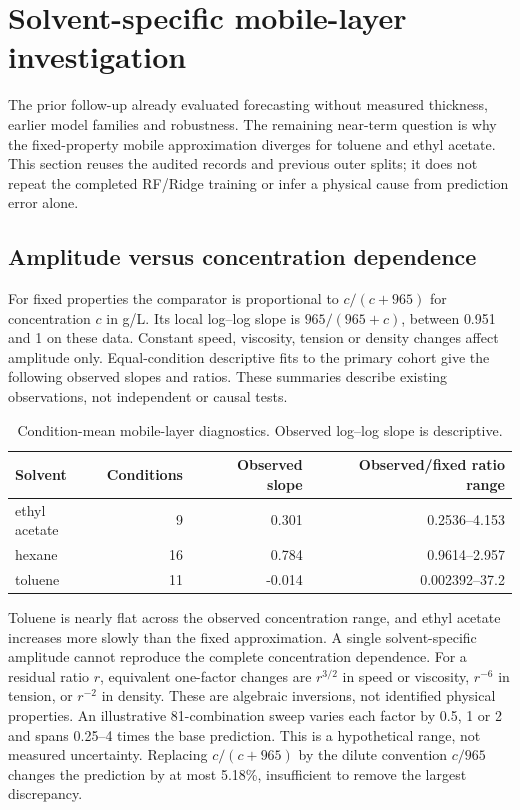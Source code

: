 \section{Solvent-specific mobile-layer investigation}

\label{sec:solvent_followup}

The prior follow-up already evaluated forecasting without measured thickness, earlier model families and robustness. The remaining near-term question is why the fixed-property mobile approximation diverges for toluene and ethyl acetate. This section reuses the audited records and previous outer splits; it does not repeat the completed RF/Ridge training or infer a physical cause from prediction error alone.

\subsection{Amplitude versus concentration dependence}

For fixed properties the comparator is proportional to $c/(c+965)$ for concentration $c$ in g/L. Its local log--log slope is $965/(965+c)$, between 0.951 and 1 on these data. Constant speed, viscosity, tension or density changes affect amplitude only. Equal-condition descriptive fits to the primary cohort give the following observed slopes and ratios. These summaries describe existing observations, not independent or causal tests.

\begin{table}[H]\centering\small\caption{Condition-mean mobile-layer diagnostics. Observed log--log slope is descriptive.}\begin{tabular}{lrrr}\toprule Solvent & Conditions & Observed slope & Observed/fixed ratio range \\\midrule

ethyl acetate & 9 & 0.301 & 0.2536--4.153 \\

hexane & 16 & 0.784 & 0.9614--2.957 \\

toluene & 11 & -0.014 & 0.002392--37.2 \\

\bottomrule\end{tabular}\end{table}

Toluene is nearly flat across the observed concentration range, and ethyl acetate increases more slowly than the fixed approximation. A single solvent-specific amplitude cannot reproduce the complete concentration dependence. For a residual ratio $r$, equivalent one-factor changes are $r^{3/2}$ in speed or viscosity, $r^{-6}$ in tension, or $r^{-2}$ in density. These are algebraic inversions, not identified physical properties. An illustrative 81-combination sweep varies each factor by 0.5, 1 or 2 and spans 0.25--4 times the base prediction. This is a hypothetical range, not measured uncertainty. Replacing $c/(c+965)$ by the dilute convention $c/965$ changes the prediction by at most 5.18\%, insufficient to remove the largest discrepancy.

